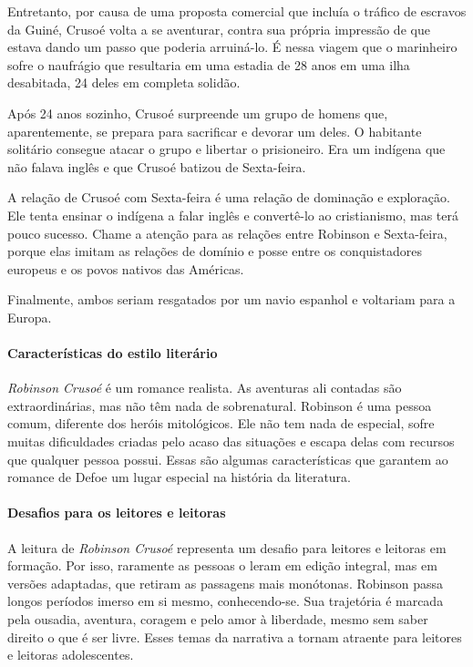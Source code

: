 \documentclass[12pt]{extarticle}
\begin{document}
Entretanto, por causa de uma proposta comercial que incluía o tráfico de
escravos da Guiné, Crusoé volta a se aventurar, contra sua própria
impressão de que estava dando um passo que poderia arruiná-lo. É nessa
viagem que o marinheiro sofre o naufrágio que resultaria em uma estadia
de 28 anos em uma ilha desabitada, 24 deles em completa solidão.


Após 24 anos sozinho, Crusoé surpreende um grupo de homens que,
aparentemente, se prepara para sacrificar e devorar um deles. O
habitante solitário consegue atacar o grupo e libertar o prisioneiro.
Era um indígena que não falava inglês e que Crusoé batizou de
Sexta-feira.

A relação de Crusoé com Sexta-feira é uma relação de dominação e
exploração. Ele tenta ensinar o indígena a falar inglês e convertê-lo ao
cristianismo, mas terá pouco sucesso. Chame a atenção para as relações
entre Robinson e Sexta-feira, porque elas imitam as relações de domínio
e posse entre os conquistadores europeus e os povos nativos das
Américas.

Finalmente, ambos seriam resgatados por um navio espanhol e voltariam
para a Europa.



\paragraph{Características do estilo literário}
\emph{Robinson Crusoé} é um romance realista. As aventuras ali contadas
são extraordinárias, mas não têm nada de sobrenatural. Robinson é uma
pessoa comum, diferente dos heróis mitológicos. Ele não tem nada de
especial, sofre muitas dificuldades criadas pelo acaso das situações e
escapa delas com recursos que qualquer pessoa possui. Essas são algumas
características que garantem ao romance de Defoe um lugar especial na
história da literatura.

\paragraph{Desafios para os leitores e leitoras}
A leitura de \emph{Robinson Crusoé} representa um desafio para leitores
e leitoras em formação. Por isso, raramente as pessoas o leram em edição
integral, mas em versões adaptadas, que retiram as passagens mais
monótonas. Robinson passa longos períodos imerso em si mesmo,
conhecendo-se. Sua trajetória é marcada pela ousadia, aventura, coragem
e pelo amor à liberdade, mesmo sem saber direito o que é ser livre.
Esses temas da narrativa a tornam atraente para leitores e leitoras
adolescentes.
\end{document}
